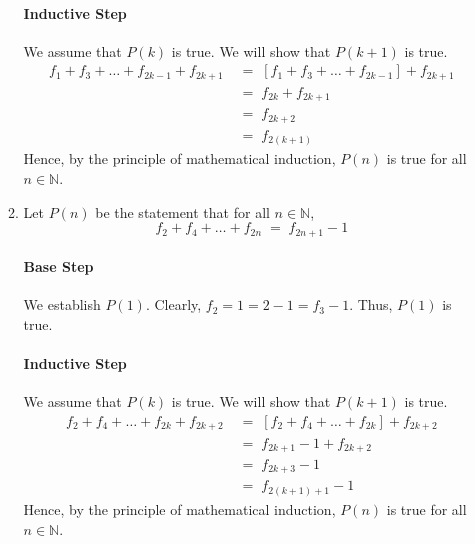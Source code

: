 \documentclass[10pt]{article}
\begin{document}
\begin{enumerate}
\begin{enumerate}
                        \paragraph{Inductive Step}
                        We assume that $P(k)$ is true. We will show that $P(k + 1)$ is true.
                        \begin{align*}
                                f_1 + f_3 + \dots + f_{2k - 1} + f_{2k + 1} 
                                        \;&=\; [f_1 + f_3 + \dots + f_{2k - 1}] + f_{2k + 1} \\
                                        \;&=\; f_{2k} + f_{2k + 1} \\
                                        \;&=\; f_{2k + 2} \\
                                        \;&=\; f_{2(k + 1)}
                        \end{align*}
                        Hence, by the principle of mathematical induction, $P(n)$ is true for all $n \in \mathbb{N}$.

                        \item Let $P(n)$ be the statement that for all $n \in \mathbb{N}$,
                        \[
                        f_2 + f_4 + \dots + f_{2n} \;=\; f_{2n + 1} - 1
                        \]
                        \paragraph{Base Step}
                        We establish $P(1)$. Clearly, $f_2 = 1 = 2 - 1 = f_3 - 1$. Thus, $P(1)$ is true.
                        \paragraph{Inductive Step}
                        We assume that $P(k)$ is true. We will show that $P(k + 1)$ is true.
                        \begin{align*}
                                f_2 + f_4 + \dots + f_{2k} + f_{2k + 2} 
                                        \;&=\; [f_2 + f_4 + \dots + f_{2k}] + f_{2k + 2} \\
                                        \;&=\; f_{2k + 1} - 1 + f_{2k + 2} \\
                                        \;&=\; f_{2k + 3} - 1 \\
                                        \;&=\; f_{2(k + 1) + 1} - 1
                        \end{align*}
                        Hence, by the principle of mathematical induction, $P(n)$ is true for all $n \in \mathbb{N}$.
                \end{enumerate}
        \end{enumerate}
\end{document}
